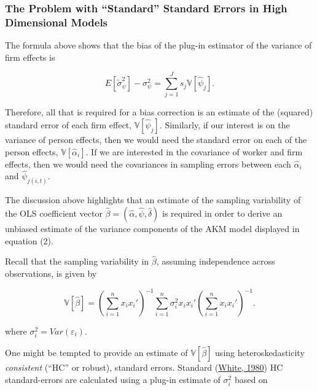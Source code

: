 \documentclass[11pt]{article}
\begin{document}
\hypertarget{the-problem-with-standard-standard-errors-in-high-dimensional-models}{%
\subsubsection{The Problem with ``Standard'' Standard Errors in High
Dimensional
Models}\label{the-problem-with-standard-standard-errors-in-high-dimensional-models}}

The formula above shows that the bias of the plug-in estimator of the
variance of firm effects is

\begin{equation}
E[\tilde{\sigma}_{\psi}^2]-\sigma^{2}_{\psi}=\sum_{j=1}^{J}s_{j}{\mathbb{V}[\hat{\psi}_{j}]}.
\end{equation}

Therefore, all that is required for a bias correction is an estimate of
the (squared) standard error of each firm effect,
\({\mathbb{V}[\hat{\psi}_{j}]}\). Similarly, if our interest is on the
variance of person effects, then we would need the standard error on
each of the person effects, \({\mathbb{V}[\hat{\alpha}_{i}]}\). If we
are interested in the covariance of worker and firm effects, then we
would need the covariances in sampling errors between each
\(\hat{\alpha}_{i}\) and \(\hat{\psi}_{j(i,t)}\).

The discussion above highlights that an estimate of the sampling
variability of the OLS coefficient vector
\(\hat{\beta}=(\hat{\alpha},\hat{\psi},\hat{\delta})\) is required in
order to derive an unbiased estimate of the variance components of the
AKM model displayed in equation (2).

Recall that the sampling variability in \(\hat{\beta}\), assuming
independence across observations, is given by

\begin{equation}
{\mathbb{{V}}}[\hat{\beta}]=\left(\sum_{i=1}^{n}x_{i}x_{i}'\right)^{-1}\sum_{i=1}^{n}{\sigma}^{2}_{i}x_{i}x_{i}'\left(\sum_{i=1}^{n}x_{i}x_{i}'\right)^{-1}.
\end{equation}

where \(\sigma^{2}_{i}=Var(\varepsilon_{i})\).

One might be tempted to provide an estimate of \(\mathbb{V}[\hat{\beta}]\)
using heteroskedasticity \emph{consistent} (``HC'' or robust), standard
errors. Standard (\href{https://www.jstor.org/stable/1912934#metadata_info_tab_contents}{White, 1980}) HC standard-errors are calculated using a plug-in
estimate of \(\sigma^{2}_{i}\) based on
\end{document}
